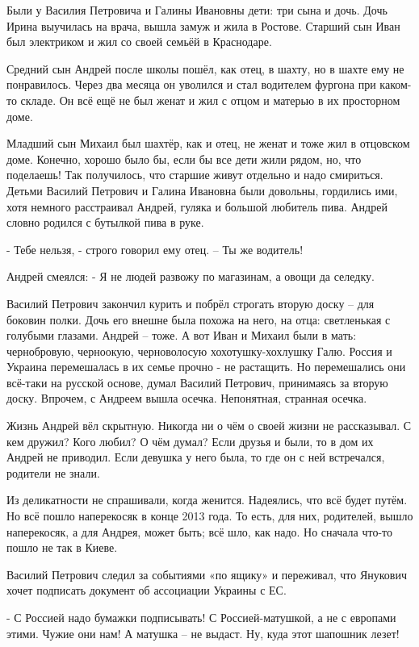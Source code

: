 Были у Василия Петровича и Галины Ивановны дети: три сына и дочь. Дочь Ирина
выучилась на врача, вышла замуж и жила в Ростове.  Старший сын Иван был
электриком и жил со своей семьёй в Краснодаре.

Средний сын Андрей после школы пошёл, как отец, в шахту, но в шахте ему не
понравилось. Через два месяца он уволился и стал водителем фургона при каком-то
складе. Он всё ещё не был женат и жил с отцом и матерью в их просторном доме.

Младший сын Михаил был шахтёр, как и отец, не женат и тоже жил в отцовском
доме. Конечно, хорошо было бы, если бы все дети жили рядом, но, что поделаешь!
Так получилось, что старшие живут отдельно и надо смириться. Детьми Василий
Петрович и Галина Ивановна были довольны, гордились ими, хотя немного
расстраивал Андрей, гуляка и большой любитель пива. Андрей словно родился с
бутылкой пива в руке.


- Тебе нельзя, - строго говорил ему отец. – Ты же водитель!

Андрей смеялся: - Я не людей развожу по магазинам, а овощи да селедку.

Василий Петрович закончил курить и побрёл строгать вторую доску – для боковин
полки. Дочь его внешне была похожа на него, на отца: светленькая с голубыми
глазами. Андрей – тоже. А вот Иван и Михаил были в мать: чернобровую,
черноокую, черноволосую хохотушку-хохлушку Галю. Россия и Украина перемешалась
в их семье прочно - не растащить.  Но перемешались они всё-таки на русской
основе, думал Василий Петрович, принимаясь за вторую доску. Впрочем, с Андреем
вышла осечка. Непонятная, странная осечка.

Жизнь Андрей вёл скрытную. Никогда ни о чём о своей жизни не рассказывал. С кем
дружил? Кого любил? О чём думал? Если друзья и были, то в дом их Андрей не
приводил. Если девушка у него была, то где он с ней встречался, родители не
знали.

Из деликатности не спрашивали, когда женится.  Надеялись, что всё будет путём.
Но всё пошло наперекосяк в конце 2013 года. То есть, для них, родителей, вышло
наперекосяк, а для Андрея, может быть; всё шло, как надо. Но сначала что-то
пошло не так в Киеве.

Василий Петрович следил за событиями «по ящику» и переживал, что Янукович хочет
подписать документ об ассоциации Украины с ЕС.

- С Россией надо бумажки подписывать! С Россией-матушкой, а не с европами
этими. Чужие они нам! А матушка – не выдаст. Ну, куда этот шапошник лезет!

